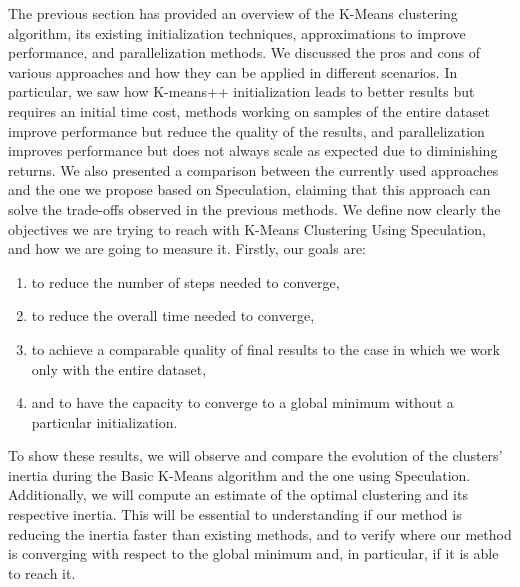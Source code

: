 The previous section has provided an overview of the K-Means clustering algorithm, its existing initialization techniques, approximations to improve performance, and parallelization methods. We discussed the pros and cons of various approaches and how they can be applied in different scenarios. In particular, we saw how K-means++ initialization leads to better results but requires an initial time cost, methods working on samples of the entire dataset improve performance but reduce the quality of the results, and parallelization improves performance but does not always scale as expected due to diminishing returns. We also presented a comparison between the currently used approaches and the one we propose based on Speculation, claiming that this approach can solve the trade-offs observed in the previous methods.
We define now clearly the objectives we are trying to reach with K-Means Clustering Using Speculation, and how we are going to measure it.
Firstly, our goals are:
\begin{enumerate}
    \item to reduce the number of steps needed to converge,
    \item to reduce the overall time needed to converge,
    \item to achieve a comparable quality of final results to the case in which we work only with the entire dataset,
    \item and to have the capacity to converge to a global minimum without a particular initialization.
\end{enumerate}
To show these results, we will observe and compare the evolution of the clusters' inertia during the Basic K-Means algorithm and the one using Speculation. Additionally, we will compute an estimate of the optimal clustering and its respective inertia.
This will be essential to understanding if our method is reducing the inertia faster than existing methods, and to verify where our method is converging with respect to the global minimum and, in particular, if it is able to reach it.